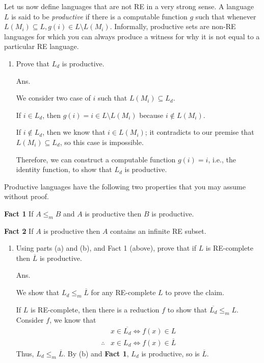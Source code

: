 \documentclass[11pt]{homework}
\begin{document}
Let us now define languages that are not RE in a very strong sense.
A language \(L\) is said to be \emph{productive}
if there is a computable function \(g\) such that whenever
\(L(M_i) \subseteq L, g(i) \in L \setminus L(M_i)\).
Informally, productive sets are non-RE languages for which you can always produce
a witness for why it is not equal to a particular RE language.
\begin{enumerate}[label=(\alph*), resume]
  \item Prove that \(L_d\) is productive.

Ans.

We consider two case of \(i\) such that \(L(M_i) \subseteq L_d\).

If \(i \in L_d\), then \(g(i) = i \in L \setminus L(M_i)\) because \(i \not\in L(M_i)\).

If \(i \not\in L_d\), then we know that \(i \in L(M_i)\);
it contradicts to our premise that \(L(M_i) \subseteq L_d\),
so this case is impossible.

Therefore, we can construct a computable function \(g(i) = i\), i.e., the identity function, to show that \(L_d\) is productive.
\end{enumerate}

Productive languages have the following two properties that you may assume without proof.

\textbf{Fact 1} If \(A \leq_m B\) and \(A\) is productive then \(B\) is productive.

\textbf{Fact 2} If \(A\) is productive then \(A\) contains an infinite RE subset.
\begin{enumerate}[label=(\alph*), resume]
    \item Using parts (a) and (b), and Fact 1 (above), 
          prove that if \(L\) is RE-complete then \(\overline{L}\) is productive.

Ans.

We show that \(L_d \leq_m \overline{L}\) for any RE-complete \(L\) to prove the claim.

If \(L\) is RE-complete, then there is a reduction \(f\) to show that \(\overline{L_d} \leq_m L\).
Consider \(f\), we know that
\[
\begin{array}{rl}
           & x \in \overline{L_d} \Leftrightarrow f(x) \in L \\
\therefore & x \in L_d \Leftrightarrow f(x) \in \overline{L}
\end{array}
\]
Thus, \(L_d \leq_m \overline{L}\).
By (b) and \textbf{Fact 1}, \(L_d\) is productive, so is \(\overline{L}\).

\end{enumerate}
\end{document}
